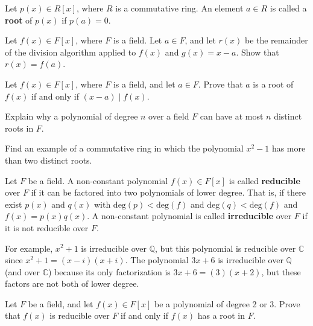 \begin{definition}
Let \(p(x) \in R[x]\), where \(R\) is a commutative ring. An element \(a \in R\) is called a \textbf{root} of \(p(x)\) if \(p(a) = 0\).
\end{definition}

\begin{problem}
Let \(f(x) \in F[x] \), where \(F\) is a field. Let \(a \in F\), and let \(r(x)\) be the remainder of the division algorithm applied to \(f(x)\) and \(g(x) = x-a\). Show that \(r(x) = f(a)\).
\end{problem}

\begin{problem}
Let \(f(x) \in F[x] \), where \(F\) is a field, and let \(a\in F\). Prove that \(a\) is a root of \(f(x)\) if and only if \((x-a) \mid f(x) \).
\end{problem}

\begin{problem}
Explain why a polynomial of degree \(n\) over a field \(F\) can have at most \(n\) distinct roots in \(F\).
\end{problem}

\begin{problem}
Find an example of a commutative ring in which the polynomial $x^2-1$ has more than two distinct roots.
\end{problem}

\begin{definition}
Let \(F\) be a field. A non-constant polynomial \(f(x)\in F[x]\) is called \textbf{reducible} over \(F\) if it can be factored into two polynomials of lower degree. That is, if there exist \(p(x)\) and \(q(x)\) with \(\text{deg}(p)<\text{deg}(f)\) and \(\text{deg}(q)<\text{deg}(f)\) and \(f(x)=p(x)q(x)\). A non-constant polynomial is called \textbf{irreducible} over \(F\) if it is not reducible over \(F\).
\end{definition}

For example, \(x^2+1\) is irreducible over \(\mathbb{Q}\), but this polynomial is reducible over \(\mathbb{C}\) since \(x^2+1 = (x-i)(x+i)\). The polynomial \(3x+6\) is irreducible over \(\mathbb{Q}\) (and over \(\mathbb{C}\)) because its only factorization is \(3x+6 = (3)(x+2)\), but these factors are not both of lower degree.

\begin{problem}\label{prob:deg2or3irr}
Let \(F\) be a field, and let \(f(x)\in F[x]\) be a polynomial of degree 2 or 3. Prove that \(f(x)\) is reducible over \(F\) if and only if \(f(x)\) has a root in \(F\).
\end{problem}

